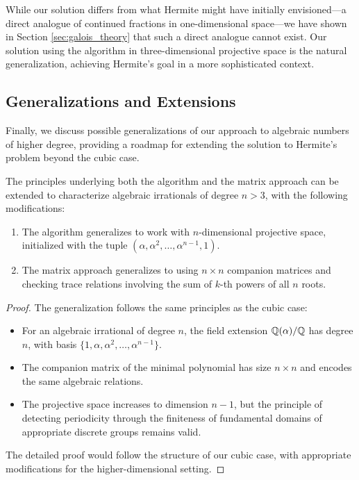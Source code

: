 \begin{remark}
While our solution differs from what Hermite might have initially envisioned—a direct analogue of continued fractions in one-dimensional space—we have shown in Section \ref{sec:galois_theory} that such a direct analogue cannot exist. Our solution using the \HAPD{} algorithm in three-dimensional projective space is the natural generalization, achieving Hermite's goal in a more sophisticated context.
\end{remark}

\subsection{Generalizations and Extensions}

Finally, we discuss possible generalizations of our approach to algebraic numbers of higher degree, providing a roadmap for extending the solution to Hermite's problem beyond the cubic case.

\begin{theorem}\label{thm:generalization}
The principles underlying both the \HAPD{} algorithm and the matrix approach can be extended to characterize algebraic irrationals of degree $n > 3$, with the following modifications:
\begin{enumerate}
    \item The \HAPD{} algorithm generalizes to work with $n$-dimensional projective space, initialized with the tuple $(\alpha, \alpha^2, \ldots, \alpha^{n-1}, 1)$.
    \item The matrix approach generalizes to using $n \times n$ companion matrices and checking trace relations involving the sum of $k$-th powers of all $n$ roots.
\end{enumerate}
\end{theorem}

\begin{proof}
The generalization follows the same principles as the cubic case:
\begin{itemize}
    \item For an algebraic irrational of degree $n$, the field extension $\mathbb{Q}(\alpha)/\mathbb{Q}$ has degree $n$, with basis $\{1, \alpha, \alpha^2, \ldots, \alpha^{n-1}\}$.
    \item The companion matrix of the minimal polynomial has size $n \times n$ and encodes the same algebraic relations.
    \item The projective space increases to dimension $n-1$, but the principle of detecting periodicity through the finiteness of fundamental domains of appropriate discrete groups remains valid.
\end{itemize}

The detailed proof would follow the structure of our cubic case, with appropriate modifications for the higher-dimensional setting.
\end{proof}

